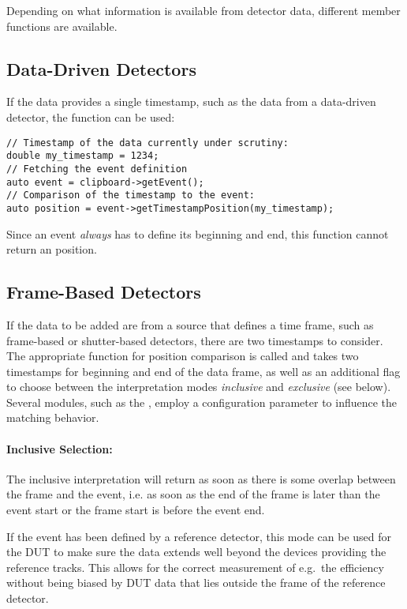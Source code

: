 Depending on what information is available from detector data, different member functions are available.

\subsection{Data-Driven Detectors}
If the data provides a single timestamp, such as the data from a data-driven detector, the  function can be used:

\begin{verbatim}
// Timestamp of the data currently under scrutiny:
double my_timestamp = 1234;
// Fetching the event definition
auto event = clipboard->getEvent();
// Comparison of the timestamp to the event:
auto position = event->getTimestampPosition(my_timestamp);
\end{verbatim}

Since an event \emph{always} has to define its beginning and end, this function cannot return an  position.

\subsection{Frame-Based Detectors}
If the data to be added are from a source that defines a time frame, such as frame-based or shutter-based detectors, there are two timestamps to consider.
The appropriate function for position comparison is called  and takes two timestamps for beginning and end of the data frame, as well as an additional flag to choose between the interpretation modes \emph{inclusive} and \emph{exclusive} (see below).
Several modules, such as the , employ a configuration parameter to influence the matching behavior.

\paragraph{Inclusive Selection:}
The inclusive interpretation will return  as soon as there is some overlap between the frame and the event, i.e. as soon as the end of the frame is later than the event start or the frame start is before the event end.

If the event has been defined by a reference detector, this mode can be used for the DUT to make sure the data extends well beyond the devices providing the reference tracks.
This allows for the correct measurement of e.g.\ the efficiency without being biased by DUT data that lies outside the frame of the reference detector.

